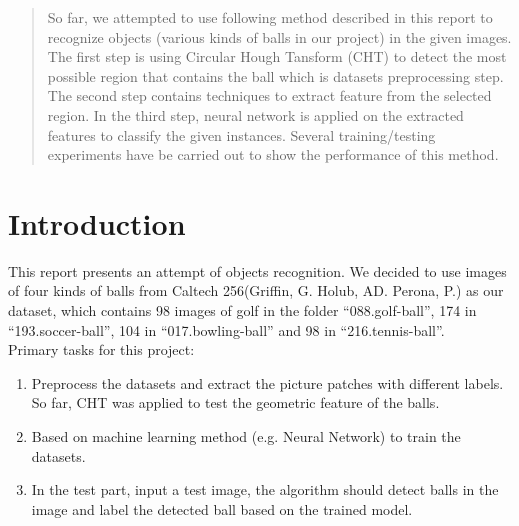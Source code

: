 \documentclass{article}
\begin{document}
 


\begin{abstract} 
So far, we attempted to use following method described in this report to recognize objects (various kinds of balls in our project) in the given images. The first step is using Circular Hough Tansform (CHT) to detect the most possible region that contains the ball which is datasets preprocessing step. The second step contains techniques to extract feature from the selected region. In the third step, neural network is applied on the extracted features to classify the given instances. Several training/testing experiments have be carried out to show the performance of this method.
\end{abstract}


\section{Introduction}

This report presents an attempt of objects recognition. We decided to use images of four kinds of balls from Caltech 256(Griffin, G. Holub, AD. Perona, P.) as our dataset, which contains 98 images of golf in the folder ``088.golf-ball'', 174 in ``193.soccer-ball'', 104 in ``017.bowling-ball'' and 98 in ``216.tennis-ball''.\\
Primary tasks for this project:
\begin{enumerate}
\item Preprocess the datasets and extract the picture patches with different labels. So far, CHT was applied to test the geometric feature of the balls.
\item Based on machine learning method (e.g. Neural Network) to train the datasets.
\item In the test part, input a test image, the algorithm should detect balls in the image and label the detected ball based on the trained model. 
\end{enumerate}
\end{document}
